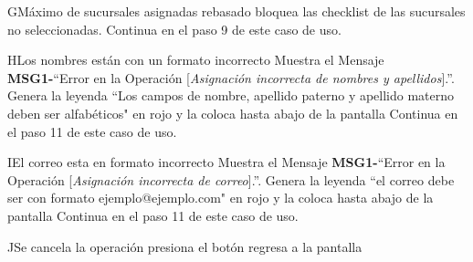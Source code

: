 	\begin{UCtrayectoriaA}{G}{Máximo de sucursales asignadas rebasado}
			\UCpaso bloquea las checklist de las sucursales no seleccionadas.
			\UCpaso Continua en el paso 9 de este caso de uso.
		\end{UCtrayectoriaA}		
		\begin{UCtrayectoriaA}{H}{Los nombres están con un formato incorrecto}
		\UCpaso Muestra el Mensaje {\bf MSG1-}``Error en la Operación [{\em Asignación incorrecta de nombres y apellidos}].''.
			\UCpaso Genera la leyenda ``Los campos de nombre, apellido paterno y apellido materno deben ser alfabéticos" en rojo y la coloca hasta abajo de la pantalla 
			\UCpaso Continua en el paso 11 de este caso de uso.
		\end{UCtrayectoriaA}
		\begin{UCtrayectoriaA}{I}{El correo esta en formato incorrecto}
		\UCpaso Muestra el Mensaje {\bf MSG1-}``Error en la Operación [{\em Asignación incorrecta de correo}].''.
			\UCpaso Genera la leyenda ``el correo debe ser con formato ejemplo@ejemplo.com" en rojo y la coloca hasta abajo de la pantalla 
			\UCpaso Continua en el paso 11 de este caso de uso.
		\end{UCtrayectoriaA}
	\begin{UCtrayectoriaA}{J}{Se cancela la operación}
			\UCpaso [\UCactor] presiona el botón 
			\UCpaso regresa a la pantalla  
		\end{UCtrayectoriaA}